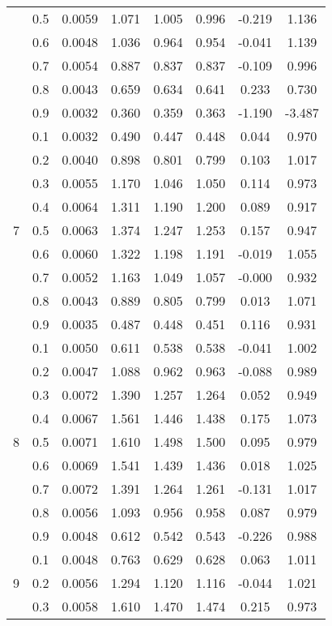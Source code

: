 \documentclass[11pt,a4paper]{report}
\begin{document}
\begin{longtable}{ | c | c || c | c | c | c | c | c | }
 & 0.5 & 0.0059 & 1.071 & 1.005 & 0.996 & -0.219 & 1.136 \\
 & 0.6 & 0.0048 & 1.036 & 0.964 & 0.954 & -0.041 & 1.139 \\
 & 0.7 & 0.0054 & 0.887 & 0.837 & 0.837 & -0.109 & 0.996 \\
 & 0.8 & 0.0043 & 0.659 & 0.634 & 0.641 & 0.233 & 0.730 \\
 & 0.9 & 0.0032 & 0.360 & 0.359 & 0.363 & -1.190 & -3.487 \\
 \hline
\multirow{9}{*}{7} & 0.1 & 0.0032 & 0.490 & 0.447 & 0.448 & 0.044 & 0.970 \\
 & 0.2 & 0.0040 & 0.898 & 0.801 & 0.799 & 0.103 & 1.017 \\
 & 0.3 & 0.0055 & 1.170 & 1.046 & 1.050 & 0.114 & 0.973 \\
 & 0.4 & 0.0064 & 1.311 & 1.190 & 1.200 & 0.089 & 0.917 \\
 & 0.5 & 0.0063 & 1.374 & 1.247 & 1.253 & 0.157 & 0.947 \\
 & 0.6 & 0.0060 & 1.322 & 1.198 & 1.191 & -0.019 & 1.055 \\
 & 0.7 & 0.0052 & 1.163 & 1.049 & 1.057 & -0.000 & 0.932 \\
 & 0.8 & 0.0043 & 0.889 & 0.805 & 0.799 & 0.013 & 1.071 \\
 & 0.9 & 0.0035 & 0.487 & 0.448 & 0.451 & 0.116 & 0.931 \\
 \hline
\multirow{9}{*}{8} & 0.1 & 0.0050 & 0.611 & 0.538 & 0.538 & -0.041 & 1.002 \\
 & 0.2 & 0.0047 & 1.088 & 0.962 & 0.963 & -0.088 & 0.989 \\
 & 0.3 & 0.0072 & 1.390 & 1.257 & 1.264 & 0.052 & 0.949 \\
 & 0.4 & 0.0067 & 1.561 & 1.446 & 1.438 & 0.175 & 1.073 \\
 & 0.5 & 0.0071 & 1.610 & 1.498 & 1.500 & 0.095 & 0.979 \\
 & 0.6 & 0.0069 & 1.541 & 1.439 & 1.436 & 0.018 & 1.025 \\
 & 0.7 & 0.0072 & 1.391 & 1.264 & 1.261 & -0.131 & 1.017 \\
 & 0.8 & 0.0056 & 1.093 & 0.956 & 0.958 & 0.087 & 0.979 \\
 & 0.9 & 0.0048 & 0.612 & 0.542 & 0.543 & -0.226 & 0.988 \\
 \hline
\multirow{9}{*}{9} & 0.1 & 0.0048 & 0.763 & 0.629 & 0.628 & 0.063 & 1.011 \\
 & 0.2 & 0.0056 & 1.294 & 1.120 & 1.116 & -0.044 & 1.021 \\
 & 0.3 & 0.0058 & 1.610 & 1.470 & 1.474 & 0.215 & 0.973 \\

\end{longtable}
\end{document}
